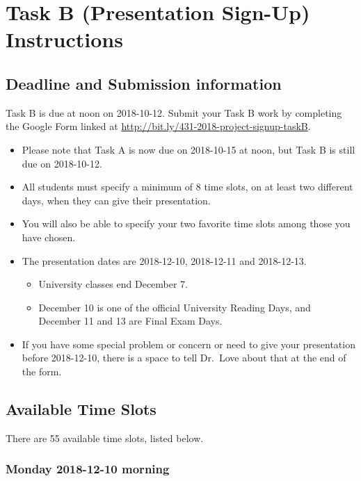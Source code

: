 \documentclass[]{book}
\providecommand{\tightlist}{%
  \setlength{\itemsep}{0pt}\setlength{\parskip}{0pt}}
\theoremstyle{definition}
\theoremstyle{definition}
\theoremstyle{definition}
\theoremstyle{remark}
\begin{document}
\hypertarget{taskB}{%
\chapter{Task B (Presentation Sign-Up) Instructions}\label{taskB}}

\hypertarget{deadline-and-submission-information-1}{%
\section{Deadline and Submission
information}\label{deadline-and-submission-information-1}}

Task B is due at noon on 2018-10-12. Submit your Task B work by
completing the Google Form linked at
\url{http://bit.ly/431-2018-project-signup-taskB}.

\begin{itemize}
\item
  Please note that Task A is now due on 2018-10-15 at noon, but Task B
  is still due on 2018-10-12.
\item
  All students must specify a minimum of 8 time slots, on at least two
  different days, when they can give their presentation.
\item
  You will also be able to specify your two favorite time slots among
  those you have chosen.
\item
  The presentation dates are 2018-12-10, 2018-12-11 and 2018-12-13.

  \begin{itemize}
  \tightlist
  \item
    University classes end December 7.
  \item
    December 10 is one of the official University Reading Days, and
    December 11 and 13 are Final Exam Days.
  \end{itemize}
\item
  If you have some special problem or concern or need to give your
  presentation before 2018-12-10, there is a space to tell Dr.~Love
  about that at the end of the form.
\end{itemize}

\hypertarget{available-time-slots}{%
\section{Available Time Slots}\label{available-time-slots}}

There are 55 available time slots, listed below.

\hypertarget{monday-2018-12-10-morning}{%
\subsection{Monday 2018-12-10 morning}\label{monday-2018-12-10-morning}}
\end{document}
